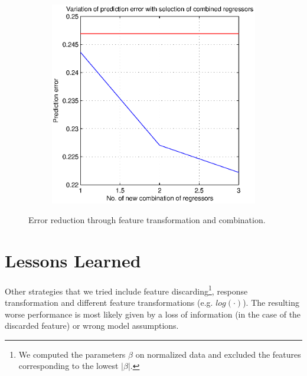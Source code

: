 \documentclass[a4paper, 11pt]{article}
\begin{document}
\begin{figure}[h!]
\begin{subfigure}[b]{0.375\textwidth}
                \includegraphics[width=\textwidth]{../figures/regressorCombination.eps}
                \label{fig:mouse}
        \end{subfigure}
        \caption{Error reduction through feature transformation and combination.}\label{fig:animals}
\end{figure}
\section{Lessons Learned} 
Other strategies that we tried include feature discarding\footnote{We computed the parameters $\beta$ on normalized data and excluded the features corresponding to the lowest $|\beta|$. }, response transformation and different feature transformations (e.g. $log(\cdot)$).
The resulting worse performance is most likely given by a loss of information (in the case of the discarded feature) or wrong model assumptions.
\end{document}
